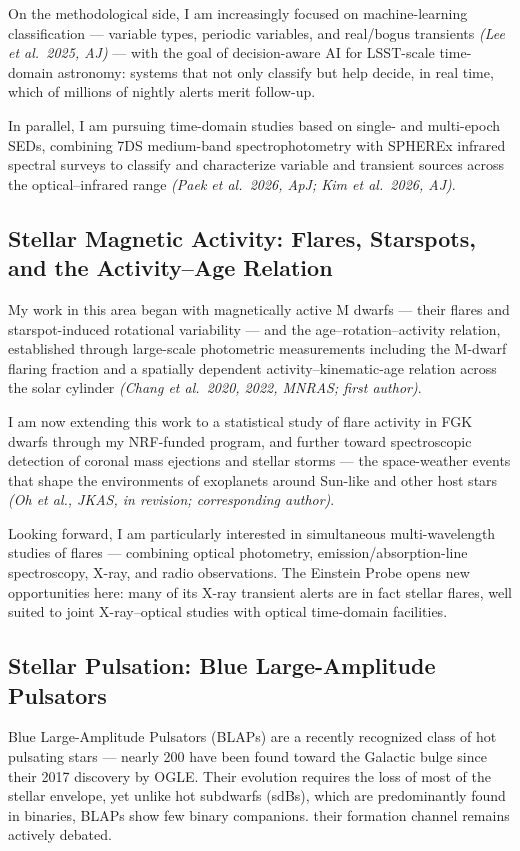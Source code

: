 \documentclass[letterpaper,11pt]{article}
\begin{document}
\smallskip
On the methodological side, I am increasingly focused on machine-learning classification
--- variable types, periodic variables, and real/bogus transients \emph{(Lee et al.\ 2025,
AJ)} --- with the goal of decision-aware AI for LSST-scale time-domain astronomy: systems
that not only classify but help decide, in real time, which of millions of nightly alerts
merit follow-up.

\smallskip
In parallel, I am pursuing time-domain studies based on single- and multi-epoch SEDs,
combining 7DS medium-band spectrophotometry with SPHEREx infrared spectral surveys to
classify and characterize variable and transient sources across the optical--infrared
range \emph{(Paek et al.\ 2026, ApJ; Kim et al.\ 2026, AJ)}.

\subsection*{Stellar Magnetic Activity: Flares, Starspots, and the Activity--Age Relation}
My work in this area began with magnetically active M dwarfs --- their flares and
starspot-induced rotational variability --- and the age--rotation--activity relation,
established through large-scale photometric measurements including the M-dwarf flaring
fraction and a spatially dependent activity--kinematic-age relation across the solar
cylinder \emph{(Chang et al.\ 2020, 2022, MNRAS; first author)}.

\smallskip
I am now extending this work to a statistical study of flare activity in FGK dwarfs
through my NRF-funded program, and further toward spectroscopic detection of coronal mass
ejections and stellar storms --- the space-weather events that shape the environments of
exoplanets around Sun-like and other host stars \emph{(Oh et al., JKAS, in revision;
corresponding author)}.

\smallskip
Looking forward, I am particularly interested in simultaneous multi-wavelength studies of
flares --- combining optical photometry, emission/absorption-line spectroscopy, X-ray, and
radio observations. The Einstein Probe opens new opportunities here: many of its X-ray
transient alerts are in fact stellar flares, well suited to joint X-ray--optical studies
with optical time-domain facilities.

\subsection*{Stellar Pulsation: Blue Large-Amplitude Pulsators}
Blue Large-Amplitude Pulsators (BLAPs) are a recently recognized class of hot pulsating
stars --- nearly 200 have been found toward the Galactic bulge since their 2017 discovery
by OGLE. Their evolution requires the loss of most of the stellar envelope, yet unlike hot
subdwarfs (sdBs), which are predominantly found in binaries, BLAPs show few binary
companions. their formation channel remains actively debated. %
\end{document}

